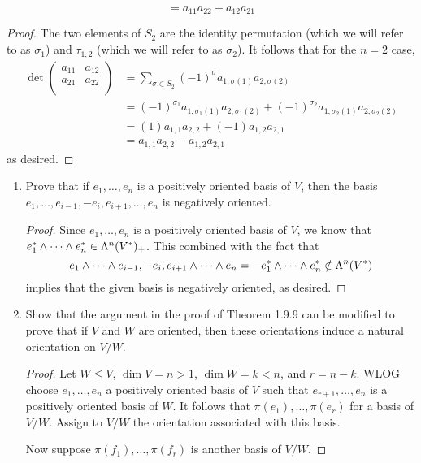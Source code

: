\documentclass[../psets.tex]{subfiles}
\begin{document}
\begin{enumerate}[label={\textbf{1.8.\roman*.}}]
\begin{equation*}
        = a_{11}a_{22}-a_{12}a_{21}
    \end{equation*}
    \begin{proof}
        The two elements of $S_2$ are the identity permutation (which we will refer to as $\sigma_1$) and $\tau_{1,2}$ (which we will refer to as $\sigma_2$). It follows that for the $n=2$ case,
        \begin{align*}
            \det
            \begin{pmatrix}
                a_{11} & a_{12}\\
                a_{21} & a_{22}\\
            \end{pmatrix}
            &= \sum_{\sigma\in S_2}(-1)^\sigma a_{1,\sigma(1)}a_{2,\sigma(2)}\\
            &= (-1)^{\sigma_1}a_{1,\sigma_1(1)}a_{2,\sigma_1(2)}+(-1)^{\sigma_2}a_{1,\sigma_2(1)}a_{2,\sigma_2(2)}\\
            &= (1)a_{1,1}a_{2,2}+(-1)a_{1,2}a_{2,1}\\
            &= a_{1,1}a_{2,2}-a_{1,2}a_{2,1}
        \end{align*}
        as desired.
    \end{proof}
\end{enumerate}
\begin{enumerate}[label={\textbf{1.9.\roman*.}}]
    \item Prove that if $e_1,\dots,e_n$ is a positively oriented basis of $V$, then the basis $e_1,\dots,e_{i-1},-e_i,e_{i+1},\dots,e_n$ is negatively oriented.
    \begin{proof}
        Since $e_1,\dots,e_n$ is a positively oriented basis of $V$, we know that $e_1^*\wedge\cdots\wedge e_n^*\in\lam[n]{V^*}_+$. This combined with the fact that
        \begin{equation*}
            e_1\wedge\cdots\wedge e_{i-1},-e_i,e_{i+1}\wedge\cdots\wedge e_n = -e_1^*\wedge\cdots\wedge e_n^*
            \notin \lam[n]{V^*}
        \end{equation*}
        implies that the given basis is negatively oriented, as desired.
    \end{proof}
    \item Show that the argument in the proof of Theorem 1.9.9 can be modified to prove that if $V$ and $W$ are oriented, then these orientations induce a natural orientation on $V/W$.
    \begin{proof}
        Let $W\leq V$, $\dim V=n>1$, $\dim W=k<n$, and $r=n-k$. WLOG choose $e_1,\dots,e_n$ a positively oriented basis of $V$ such that $e_{r+1},\dots,e_n$ is a positively oriented basis of $W$. It follows that $\pi(e_1),\dots,\pi(e_r)$ for a basis of $V/W$. Assign to $V/W$ the orientation associated with this basis.\par
        Now suppose $\pi(f_1),\dots,\pi(f_r)$ is another basis of $V/W$.
    \end{proof}
\end{enumerate}
\end{document}
